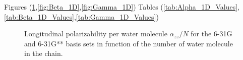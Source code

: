 \documentclass[prl,aps,twocolumn,showpacs,twocolumngrid,superbib]{revtex4}
\begin{document}
Figures (\ref{fig:Alpha_1D},\ref{fig:Beta_1D},\ref{fig:Gamma_1D})
Tables (\ref{tab:Alpha_1D_Values},\ref{tab:Beta_1D_Values},\ref{tab:Gamma_1D_Values})


\begin{figure}[t]
  \caption{\protect
    Longitudinal polarizability per water molecule
    $\alpha_{zz}/N$ for 
    the 6-31G and 6-31G** basis sets in function
    of the number of water molecule in the chain.
  }\label{fig:Alpha_1D}
\end{figure}
\end{document}
